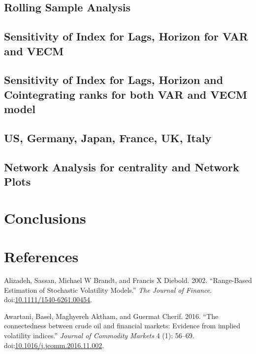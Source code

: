 \documentclass[]{elsarticle} %
\begin{document}
\subsection{Rolling Sample Analysis}\label{rolling-sample-analysis}

\subsection{Sensitivity of Index for Lags, Horizon for VAR and
VECM}\label{sensitivity-of-index-for-lags-horizon-for-var-and-vecm}

\subsection{Sensitivity of Index for Lags, Horizon and Cointegrating
ranks for both VAR and VECM
model}\label{sensitivity-of-index-for-lags-horizon-and-cointegrating-ranks-for-both-var-and-vecm-model}

\subsection{US, Germany, Japan, France, UK,
Italy}\label{us-germany-japan-france-uk-italy}

\subsection{Network Analysis for centrality and Network
Plots}\label{network-analysis-for-centrality-and-network-plots}

\section{Conclusions}\label{conclusions}

\section*{References}\label{references}

\hypertarget{refs}{}
\hypertarget{ref-Alizadeh2002}{}
Alizadeh, Sassan, Michael W Brandt, and Francis X Diebold. 2002.
``Range-Based Estimation of Stochastic Volatility Models.'' \emph{The
Journal of Finance}.
doi:\href{https://doi.org/10.1111/1540-6261.00454}{10.1111/1540-6261.00454}.

\hypertarget{ref-Awartani2016}{}
Awartani, Basel, Maghyereh Aktham, and Guermat Cherif. 2016. ``The
connectedness between crude oil and financial markets: Evidence from
implied volatility indices.'' \emph{Journal of Commodity Markets} 4 (1):
56--69.
doi:\href{https://doi.org/10.1016/j.jcomm.2016.11.002}{10.1016/j.jcomm.2016.11.002}.
\end{document}
